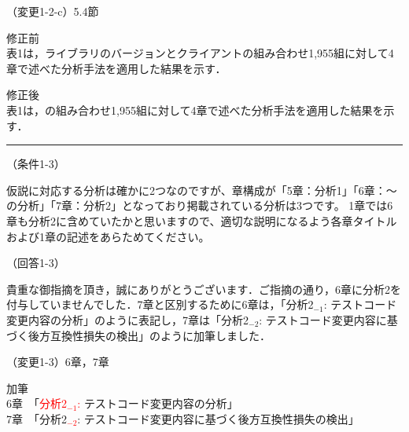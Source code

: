\documentclass{jarticle} %
\def\subsection#1{ \vspace{1pc} {\gt #1} }
\def\nextans{ \vspace{2pc} \hrule }
\begin{document}
\subsection{（変更1-2-c）5.4節}
\vspace{-0.3cm}
\begin{description}
\item 修正前\\
\phantom{　}
表1は，ライブラリのバージョンとクライアントの組み合わせ1,955組に対して4章で述べた分析手法を適用した結果を示す．
\vspace{-0.3cm}
\item 修正後\\
\phantom{　}
表1は，\textcolor{red}{}の組み合わせ1,955組に対して4章で述べた分析手法を適用した結果を示す．
\end{description}

\newpage
\nextans
\subsection{（条件1-3）}

仮説に対応する分析は確かに2つなのですが、章構成が「5章：分析1」「6章：～の分析」「7章：分析2」となっており掲載されている分析は3つです。
1章では6章も分析2に含めていたかと思いますので、適切な説明になるよう各章タイトルおよび1章の記述をあらためてください。

\subsection{（回答1-3）}

貴重な御指摘を頂き，誠にありがとうございます．ご指摘の通り，6章に分析2を付与していませんでした．7章と区別するために6章は，「分析2$_{-1}$: テストコード変更内容の分析」のように表記し，7章は「分析2$_{-2}$: テストコード変更内容に基づく後方互換性損失の検出」のように加筆しました．


\subsection{（変更1-3）6章，7章}
\vspace{-0.3cm}
\begin{description}
\item 加筆\\
\noindent6章　「\textcolor{red}{分析2$_{-1}$: }テストコード変更内容の分析」\\
\noindent7章　「分析2\textcolor{red}{$_{-2}$}: テストコード変更内容に基づく後方互換性損失の検出」\\
\end{description}
\end{document}
